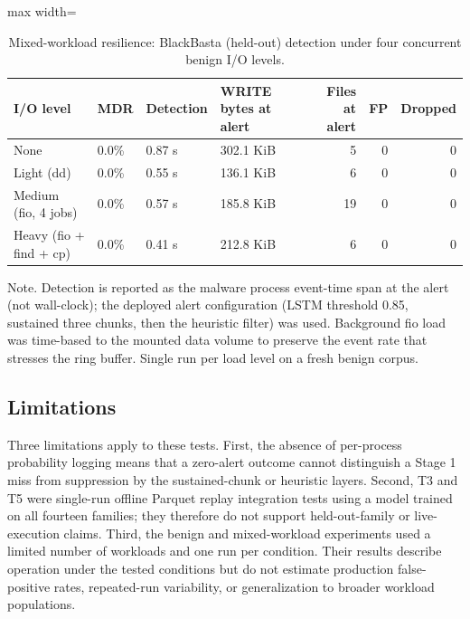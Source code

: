 \begin{table}[htbp]
\centering
\caption{Mixed-workload resilience: BlackBasta (held-out) detection under four concurrent benign I/\allowbreak{}O levels.}\label{tab:4-12}
\begin{adjustbox}{max width=\textwidth}
\small
\begin{tabular}{llllrrr}
\hline
\textbf{I/\allowbreak{}O level} & \textbf{MDR} & \textbf{Detection} & \textbf{WRITE bytes at alert} & \textbf{Files at alert} & \textbf{FP} & \textbf{Dropped} \\
\hline
None & 0.0\% & 0.87 s & 302.1 KiB & 5 & 0 & 0 \\
Light (dd) & 0.0\% & 0.55 s & 136.1 KiB & 6 & 0 & 0 \\
Medium (fio, 4 jobs) & 0.0\% & 0.57 s & 185.8 KiB & 19 & 0 & 0 \\
Heavy (fio + find + cp) & 0.0\% & 0.41 s & 212.8 KiB & 6 & 0 & 0 \\
\hline
\end{tabular}
\end{adjustbox}
\end{table}

Note. Detection is reported as the malware process event-time span at the alert (not wall-clock); the deployed alert configuration (\textmu{}LSTM threshold 0.85, sustained three chunks, then the heuristic filter) was used. Background fio load was time-based to the mounted data volume to preserve the event rate that stresses the ring buffer. Single run per load level on a fresh benign corpus.

\subsection{Limitations}\label{sec:4.8.4}

Three limitations apply to these tests. First, the absence of per-process probability logging means that a zero-alert outcome cannot distinguish a Stage 1 miss from suppression by the sustained-chunk or heuristic layers. Second, T3 and T5 were single-run offline Parquet replay integration tests using a model trained on all fourteen families; they therefore do not support held-out-family or live-execution claims. Third, the benign and mixed-workload experiments used a limited number of workloads and one run per condition. Their results describe operation under the tested conditions but do not estimate production false-positive rates, repeated-run variability, or generalization to broader workload populations.

